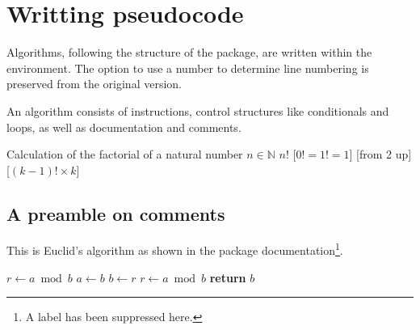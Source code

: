 \documentclass[a4paper, 11pt]{article}
\begin{document}
\begin{PDListing}
    \usepackage[noend]{algxpar}
\end{PDListing}


\section{Writting pseudocode}
Algorithms, following the structure of the  package, are written within the  environment. The option to use a number to determine line numbering is preserved from the original version.

An algorithm consists of instructions, control structures like conditionals and loops, as well as documentation and comments.

\begin{PDExample}
    \begin{algorithmic}
        \Description Calculation of the factorial of a natural number
        \Input $n \in \mathbb{N}$
        \Output $n!$
        \Statex
        [$0! = 1! = 1$]
        [from 2 up]
            [$(k-1)! \times k$]
        \EndFor
    \end{algorithmic}
\end{PDExample}

\subsection{A preamble on comments}\label{sec:a-preamble-on-comments}
This is Euclid's algorithm as shown in the  package documentation\footnote{A label has been suppressed here.}.

\begingroup
\begin{PDExample}
    \begin{algorithmic}[1]
            \State $r\gets a\bmod b$
                \State $a\gets b$
                \State $b\gets r$
                \State $r\gets a\bmod b$
            \EndWhile
            \State \textbf{return} $b$
        \EndProcedure
    \end{algorithmic}
\end{PDExample}
\endgroup
\end{document}
